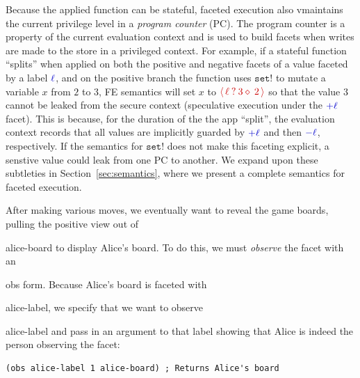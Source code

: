 \documentclass[review=true,acmlarge]{acmart}
\newcommand*{\SavedLstInline}{}
\DeclareRobustCommand*{\lstinline}{%
  \ifmmode
    \let\SavedBGroup\bgroup
    \def\bgroup{%
      \let\bgroup\SavedBGroup
      \hbox\bgroup
    }%
  \fi
  \SavedLstInline
}
\newcommand{\colorMATH}{black!20!blue}
\newcommand{\colorFAC}{black!20!red}
\newcommand{\blue}[1] {{\color{\colorMATH} #1}}
\newcommand{\fcol}[1] {{\color{\colorFAC} #1}}
\newcommand{\code}[1]{\lstinline{#1}}
\newcommand{\facet}[3]{{\fcol{\ensuremath{\langle \, {#1} \: ? \: {#2} \diamond \: {#3} \, \rangle}}}}
\begin{document}

Because the applied function can be stateful, faceted execution also
vmaintains the current privilege level in a \emph{program counter} (PC). The
program counter is a property of the current evaluation context and is used
to build facets when writes are made to the store in a privileged context.
For example, if a stateful function ``splits'' when applied on both the positive and negative
facets of a value faceted by a label $\blue{\ell}$, and on the positive branch
the function uses $\texttt{set!}$ to mutate a variable $x$ from $2$ to $3$,
FE semantics will set $x$ to $\facet{\ell}{3}{2}$ so that the value $3$
cannot be leaked from the secure context (speculative execution under the
$\blue{+\ell}$ facet). This is because, for the duration of the the app ``split'',
the evaluation context records that all values are implicitly guarded by $\blue{+\ell}$
and then $\blue{-\ell}$, respectively. If the semantics for $\texttt{set!}$ does
not make this faceting explicit, a senstive value could leak from one PC to another.
We expand upon these subtleties in Section~\ref{sec:semantics},
where we present a complete semantics for faceted execution.

After making various moves, we eventually want to reveal the game
boards, pulling the positive view out of \code{alice-board} to display
Alice's board. To do this, we must \emph{observe} the facet with an
\code{obs} form. Because Alice's board is faceted with
\code{alice-label}, we specify that we want to observe
\code{alice-label} and pass in an argument to that label showing that
Alice is indeed the person observing the facet:

\begin{lstlisting}[language=Racket,escapechar=|,name=example]
(obs alice-label 1 alice-board) ; Returns Alice's board
\end{lstlisting}
\end{document}
